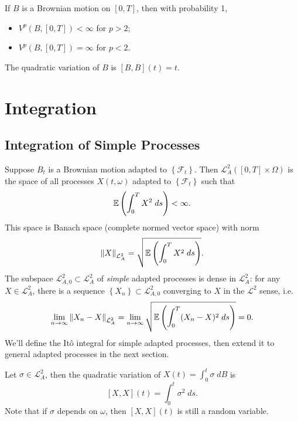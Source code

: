 \documentclass[twoside,10pt]{report}
\begin{document}
\begin{prop}
If $B$ is a Brownian motion on $[0,T]$, then with probability 1,
\begin{itemize}
	\item $V^{p}(B,[0,T]) < \infty$ for $p>2$;
	\item $V^{p}(B,[0,T]) = \infty$ for $p<2$.
\end{itemize}
The quadratic variation of $B$ is $[B,B](t) = t$.
\end{prop}


\chapter{Integration}

\section{Integration of Simple Processes}

Suppose $B_{t}$ is a Brownian motion adapted to $\left\{ \mathcal{F}_{t} \right\}$. Then $\mathcal{L}_{A}^2([0,T] \times \Omega)$ is the space of all processes $X(t,\omega)$ adapted to $\left\{ \mathcal{F}_{t} \right\}$ such that
\[
\mathbb{E} \left(  \int_{0}^{T} X^2\;ds  \right)< \infty.
\] This space is Banach space (complete normed vector space) with norm
\[
{\Vert{X}\Vert}_{\mathcal{L}_{A}^2} = \sqrt{\mathbb{E} \left(  \int_{0}^{T} X^2\;ds  \right)} .
\] 
The subspace $\mathcal{L}_{A,0}^2 \subset \mathcal{L}_{A}^2$ of \emph{simple} adapted processes is dense in $\mathcal{L}_{A}^2$: for any $X \in \mathcal{L}_{A}^2$, there is a sequence $\left\{ X_{n} \right\} \subset \mathcal{L}_{A,0}^2$ converging to $X$ in the $\mathcal{L}^2$ sense, i.e.
\[
\lim_{n \to \infty} {\Vert{X_{n}-X}\Vert}_{\mathcal{L}_{A}^2} = \lim_{n \to \infty} \sqrt{\mathbb{E} \left(  \int_{0}^{T} (X_{n}-X)^2\;ds  \right)} =0.
\] 
We'll define the It\^o integral for simple adapted processes, then extend it to general adapted processes in the next section.


\begin{prop}
Let $\sigma \in \mathcal{L}_{A}^2$, then the quadratic variation of $X(t) = \int_{0}^{t} \sigma\;dB$ is
\[
[X,X](t) = \int_{0}^{t} \sigma^{2}\;ds.
\] 
Note that if $\sigma$ depends on $\omega$, then $[X,X](t)$ is still a random variable.
\end{prop}
\end{document}
